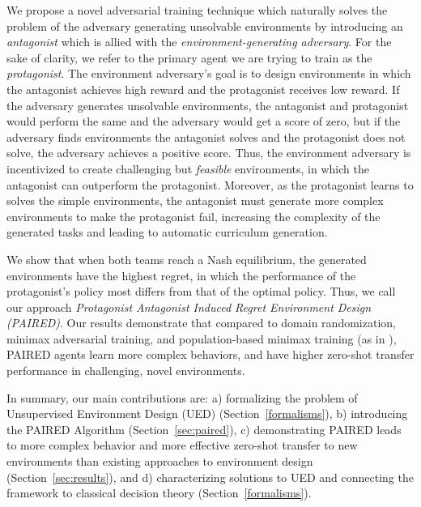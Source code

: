 \documentclass{article}
\begin{document}
We propose a novel adversarial training technique which naturally solves the problem of the adversary generating unsolvable environments by introducing an \emph{antagonist} which is allied with the \emph{environment-generating adversary}.  For the sake of clarity, we refer to the primary agent we are trying to train as the \emph{protagonist}.  The environment adversary's goal is to design environments in which the antagonist achieves high reward and the protagonist receives low reward.  If the adversary generates unsolvable environments, the antagonist and protagonist would perform the same and the adversary would get a score of zero, but if the adversary finds environments the antagonist solves and the protagonist does not solve, the adversary achieves a positive score. Thus, the environment adversary is incentivized to create challenging but \textit{feasible} environments, in which the antagonist can outperform the protagonist. Moreover, as the protagonist learns to solves the simple environments, the antagonist must generate more complex environments to make the protagonist fail, increasing the complexity of the generated tasks and leading to automatic curriculum generation.  


We show that when both teams reach a Nash equilibrium, the generated environments have the highest regret, in which the performance of the protagonist's policy most differs from that of the optimal policy. 
Thus, we call our approach \emph{Protagonist Antagonist Induced Regret Environment Design (PAIRED)}. Our results demonstrate that compared to domain randomization, minimax adversarial training, and population-based minimax training (as in \citet{wang2019paired}), PAIRED agents learn more complex behaviors, and have higher zero-shot transfer performance in challenging, novel environments.

In summary, our main contributions are: a) formalizing the problem of Unsupervised Environment Design (UED) (Section~\ref{formalisms}), b) introducing the PAIRED Algorithm (Section~\ref{sec:paired}), c) demonstrating PAIRED leads to more complex behavior and more effective zero-shot transfer to new environments than existing approaches to environment design (Section~\ref{sec:results}), and d) characterizing solutions to UED and connecting the framework to classical decision theory (Section~\ref{formalisms}).
\end{document}
